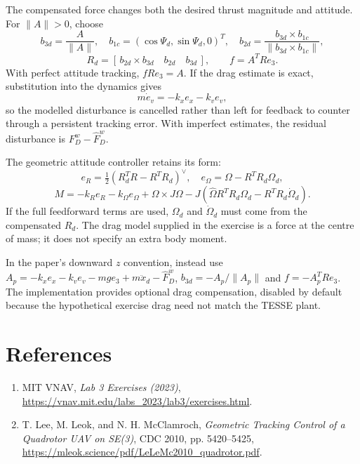 \documentclass[11pt,a4paper]{article}
\begin{document}
The compensated force changes both the desired thrust magnitude and
attitude. For $\|A\|>0$, choose
\[
 b_{3d}=\frac{A}{\|A\|},\quad b_{1c}=(\cos\Psi_d,\sin\Psi_d,0)^T,
 \quad b_{2d}=\frac{b_{3d}\times b_{1c}}{\|b_{3d}\times b_{1c}\|},
\]
\[
 R_d=[\,b_{2d}\times b_{3d}\quad b_{2d}\quad b_{3d}\,],\qquad
 \boxed{f=A^TRe_3.}
\]
With perfect attitude tracking, $fRe_3=A$. If the drag estimate is exact,
substitution into the dynamics gives
\[
 m\dot e_v=-k_xe_x-k_ve_v,
\]
so the modelled disturbance is cancelled rather than left for feedback
to counter through a persistent tracking error. With imperfect estimates,
the residual disturbance is $F_D^w-\widehat F_D^w$.

The geometric attitude controller retains its form:
\[
 e_R=\tfrac12(R_d^TR-R^TR_d)^\vee,\quad
 e_\Omega=\Omega-R^TR_d\Omega_d,
\]
\[
 M=-k_Re_R-k_\Omega e_\Omega+\Omega\times J\Omega
 -J(\widehat\Omega R^TR_d\Omega_d-R^TR_d\dot\Omega_d).
\]
If the full feedforward terms are used, $\Omega_d$ and $\dot\Omega_d$ must
come from the compensated $R_d$. The drag model supplied in the exercise
is a force at the centre of mass; it does not specify an extra body moment.

In the paper's downward $z$ convention, instead use
$A_p=-k_xe_x-k_ve_v-mg e_3+m\ddot x_d-\widehat F_D^w$,
$b_{3d}=-A_p/\|A_p\|$ and $f=-A_p^TRe_3$.
The implementation provides optional drag compensation, disabled by default
because the hypothetical exercise drag need not match the TESSE plant.

\section*{References}
\begin{enumerate}
\item MIT VNAV, \emph{Lab 3 Exercises (2023)},
\url{https://vnav.mit.edu/labs_2023/lab3/exercises.html}.
\item T. Lee, M. Leok, and N. H. McClamroch, \emph{Geometric Tracking
Control of a Quadrotor UAV on SE(3)}, CDC 2010, pp. 5420--5425,
\url{https://mleok.science/pdf/LeLeMc2010_quadrotor.pdf}.
\end{enumerate}
\end{document}
